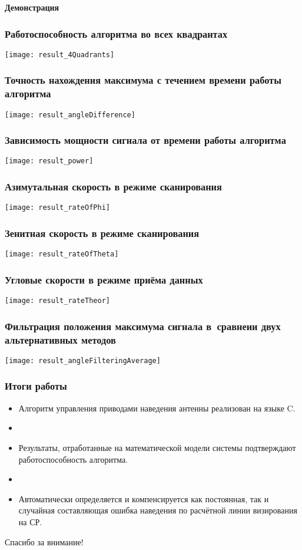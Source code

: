 \documentclass{beamer}
\begin{document}
	\begin{frame}
		\centering\Huge{\textbf{Демонстрация}}
	\end{frame}
	
	\begin{frame}\centering
		\frametitle{Работоспособность алгоритма во всех квадрантах}
		\texttt{[image: result\_4Quadrants]}
	\end{frame}
	
	\begin{frame}\centering
		\frametitle{Точность нахождения максимума с течением времени работы алгоритма}
		\texttt{[image: result\_angleDifference]}
	\end{frame}
	
	\begin{frame}\centering
		\frametitle{Зависимость мощности сигнала от времени работы алгоритма}
		\texttt{[image: result\_power]}
	\end{frame}
	
	\begin{frame}\centering
		\frametitle{Азимутальная скорость в режиме сканирования}
		\texttt{[image: result\_rateOfPhi]}
	\end{frame}
	
	\begin{frame}\centering
		\frametitle{Зенитная скорость в режиме сканирования}
		\texttt{[image: result\_rateOfTheta]}
	\end{frame}
	
	\begin{frame}\centering
		\frametitle{Угловые скорости в режиме приёма данных}
		\texttt{[image: result\_rateTheor]}
	\end{frame}
	
	\begin{frame}\centering
		\frametitle{Фильтрация положения максимума сигнала в~сравнеии двух альтернативных методов}
		\texttt{[image: result\_angleFilteringAverage]}
	\end{frame}
	
	\begin{frame}
		\frametitle{Итоги работы}
		\begin{itemize}
			\item Алгоритм управления приводами наведения антенны реализован на языке C.
			\item 
			\item Результаты, отработанные на математической модели системы подтверждают работоспособность алгоритма.
			\item 
			\item Автоматически определяется и компенсируется как постоянная, так и случайная составляющая ошибка наведения по расчётной линии визирования на СР.
		\end{itemize}
	\end{frame}
	
	\begin{frame}
		\centering\Huge{Спасибо за внимание!}
	\end{frame}
\end{document}

